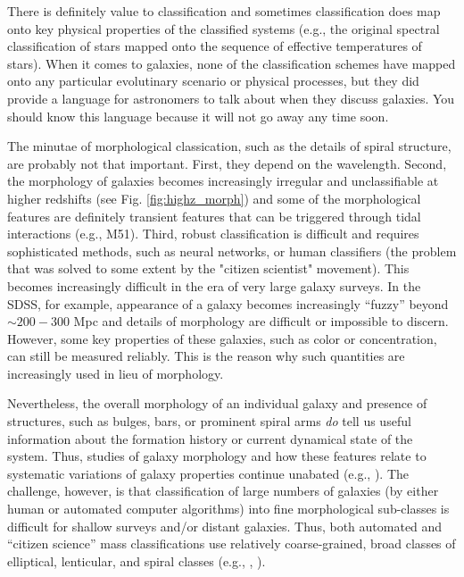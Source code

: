 There is definitely value to classification  \href{http://adsabs.harvard.edu/abs/2005ARA\%26A..43..581S}{\citep[see, e.g.,][for discussion]{sandage05}} and sometimes classification does map onto key physical properties of the classified systems (e.g., the original spectral classification of stars mapped onto the sequence of effective temperatures of stars). When it comes to galaxies, none of the classification schemes have mapped onto any particular evolutinary scenario or physical processes, but they did provide a language for astronomers to talk about when they discuss galaxies. You should know this language because it will not go away any time soon. 

The minutae of morphological classication, such as the details of spiral structure, are probably not that important. First, they depend on the wavelength. Second, the morphology of galaxies becomes increasingly irregular and unclassifiable at higher redshifts (see Fig. \ref{fig:highz_morph}) and some of the morphological features are definitely transient features that can be triggered through tidal interactions (e.g., M51). Third, robust classification is difficult and requires sophisticated methods, such as neural networks, or human classifiers (the problem that was solved to some extent by the "citizen scientist" movement). 
This becomes increasingly difficult in the era of very large galaxy surveys. In the SDSS, for example, appearance of a galaxy becomes increasingly ``fuzzy'' beyond $\sim 200-300$ Mpc and details of morphology are difficult or impossible to discern. However, some key properties of these galaxies, such as color or concentration, can still be measured reliably. This is the reason why such quantities are increasingly used in lieu of morphology.

Nevertheless, the overall morphology of an individual galaxy and presence of structures, such as bulges, bars, or prominent spiral arms \emph{do} tell us useful information about the formation history or current dynamical state of the system. Thus, studies of galaxy morphology and how these features relate to systematic variations of galaxy properties continue unabated (e.g., \href{http://adsabs.harvard.edu/abs/2015ApJS..221....8H}{\citealt{huertas_company_etal15}}). The challenge, however, is that classification of large numbers of galaxies (by either human or automated computer algorithms) into fine morphological sub-classes is difficult for shallow surveys and/or distant galaxies. Thus, both automated and ``citizen science'' mass classifications use relatively coarse-grained, broad classes of elliptical, lenticular, and spiral classes (e.g., \href{http://adsabs.harvard.edu/abs/2011A%26A...525A.157H}{\citealt{huertas_company_etal11}}, \href{http://adsabs.harvard.edu/abs/2016arXiv160206854K}{\citealt{kuminski_shamir16}}).  
 
